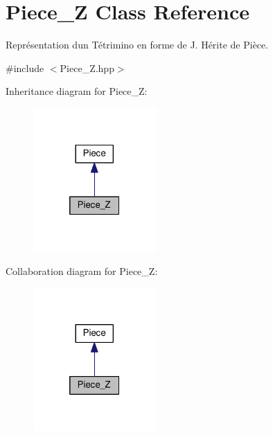 \hypertarget{classPiece__Z}{}\section{Piece\+\_\+Z Class Reference}
\label{classPiece__Z}


Représentation d\textquotesingle{}un Tétrimino en forme de J. Hérite de Pièce.  




{\ttfamily \#include $<$Piece\+\_\+\+Z.\+hpp$>$}



Inheritance diagram for Piece\+\_\+Z\+:
\nopagebreak
\begin{figure}[H]
\begin{center}
\leavevmode
\includegraphics[width=133pt]{classPiece__Z__inherit__graph}
\end{center}
\end{figure}


Collaboration diagram for Piece\+\_\+Z\+:
\nopagebreak
\begin{figure}[H]
\begin{center}
\leavevmode
\includegraphics[width=133pt]{classPiece__Z__coll__graph}
\end{center}
\end{figure}
